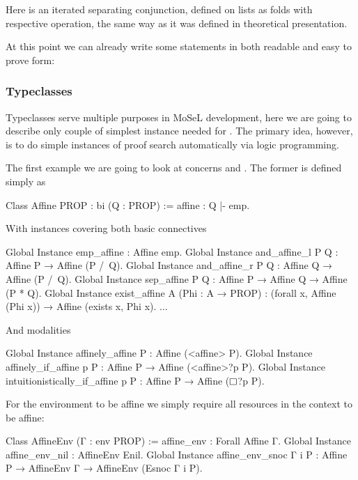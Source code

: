 Here \coqe{[*]} is an iterated separating conjunction, defined on lists as folds with respective operation, the same way as it was defined in theoretical presentation.

At this point we can already write some statements in both readable and easy to prove form:

\subsubsection{Typeclasses}
\label{subsubsec:typeclasses}

Typeclasses serve multiple purposes in MoSeL development, here we are going to describe only couple of simplest instance needed for .
The primary idea, however, is to do simple instances of proof search automatically via logic programming.

The first example we are going to look at concerns  and .
The former is defined simply as
\begin{coq}
Class Affine {PROP : bi} (Q : PROP) := affine : Q |- emp.
\end{coq}

With instances covering both basic connectives
\begin{coq}
Global Instance emp_affine : Affine emp.
Global Instance and_affine_l P Q : Affine P → Affine (P /\ Q).
Global Instance and_affine_r P Q : Affine Q → Affine (P /\ Q).
Global Instance sep_affine P Q : Affine P → Affine Q → Affine (P * Q).
Global Instance exist_affine {A} (Phi : A → PROP) :
  (forall x, Affine (Phi x)) → Affine (exists x, Phi x).
$\ldots$
\end{coq}

And modalities
\begin{coq}
Global Instance affinely_affine P : Affine (<affine> P).
Global Instance affinely_if_affine p P : Affine P → Affine (<affine>?p P).
Global Instance intuitionistically_if_affine p P : Affine P → Affine ($\mathop{\Box}$?p P).
\end{coq}

For the environment to be affine we simply require all resources in the context to be affine:
\begin{coq}
Class AffineEnv (Γ : env PROP) := affine_env : Forall Affine Γ.
Global Instance affine_env_nil : AffineEnv Enil.
Global Instance affine_env_snoc Γ i P :
  Affine P → AffineEnv Γ → AffineEnv (Esnoc Γ i P).
\end{coq}

